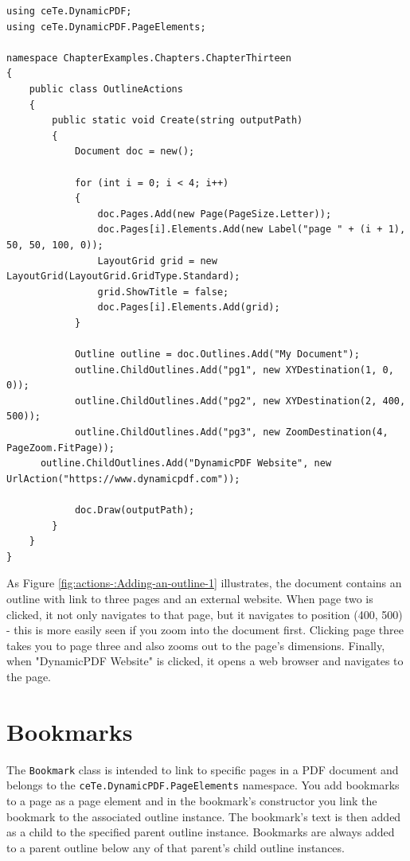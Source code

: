 \documentclass[american]{tufte-book}
\numberwithin{equation}{section}
\numberwithin{figure}{section}
\begin{document}
{\bgroup{}
\begin{lstlisting}[caption={Outline actions.},label={lis:illus-out-acti-A-PDF-document-1},basicstyle={\footnotesize\ttfamily},breaklines=true]
using ceTe.DynamicPDF;
using ceTe.DynamicPDF.PageElements;

namespace ChapterExamples.Chapters.ChapterThirteen
{
    public class OutlineActions
    {
        public static void Create(string outputPath)
        {
            Document doc = new();

            for (int i = 0; i < 4; i++)
            {
                doc.Pages.Add(new Page(PageSize.Letter));
                doc.Pages[i].Elements.Add(new Label("page " + (i + 1), 50, 50, 100, 0));
                LayoutGrid grid = new LayoutGrid(LayoutGrid.GridType.Standard);
                grid.ShowTitle = false;
                doc.Pages[i].Elements.Add(grid);
            }

            Outline outline = doc.Outlines.Add("My Document");
            outline.ChildOutlines.Add("pg1", new XYDestination(1, 0, 0));
            outline.ChildOutlines.Add("pg2", new XYDestination(2, 400, 500));
            outline.ChildOutlines.Add("pg3", new ZoomDestination(4, PageZoom.FitPage));
      outline.ChildOutlines.Add("DynamicPDF Website", new UrlAction("https://www.dynamicpdf.com"));
        
            doc.Draw(outputPath);
        }
    }
}
\end{lstlisting}
\leavevmode\egroup

As Figure \ref{fig:actions-:Adding-an-outline-1} illustrates, the
document contains an outline with link to three pages and an external
website. When page two is clicked, it not only navigates to that page,
but it navigates to position (400, 500) - this is more easily seen
if you zoom into the document first. Clicking page three takes you
to page three and also zooms out to the page's dimensions. Finally,
when "DynamicPDF Website" is clicked, it opens a web browser and
navigates to the page.

\section{Bookmarks}

The \texttt{Bookmark} class is intended to link to specific pages
in a PDF document and belongs to the \texttt{ceTe.DynamicPDF\allowbreak.PageElements}
namespace. You add bookmarks to a page as a page element and in the
bookmark's constructor you link the bookmark to the associated outline
instance. The bookmark's text is then added as a child to the specified
parent outline instance. Bookmarks are always added to a parent outline
below any of that parent's child outline instances. 

}
\end{document}
